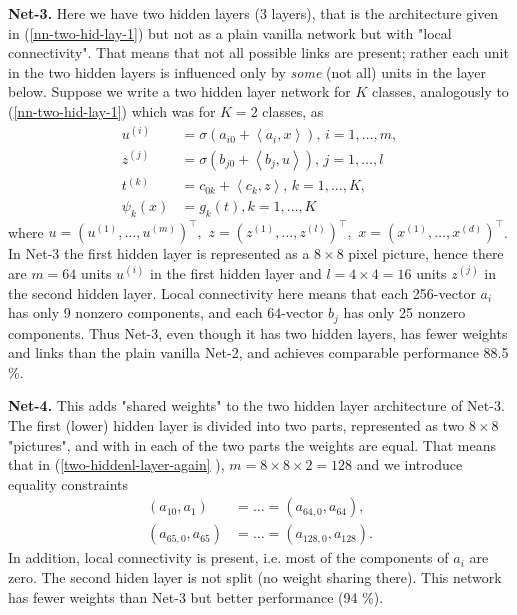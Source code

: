 \documentclass[11pt,twoside]{article}%
\theoremstyle{change}
\begin{document}
\bigskip

\textbf{Net-3.} Here we have two hidden layers (3 layers), that is the
architecture given in (\ref{nn-two-hid-lay-1}) but not as a plain vanilla
network but with "local connectivity". That means that not all possible links
are present; rather each unit in the two hidden layers is influenced only by
\textit{some} (not all) units in the layer below. Suppose we write a two
hidden layer network for $K$ classes, analogously to (\ref{nn-two-hid-lay-1})
which was for $K=2$ classes, as
\begin{align}
u^{(i)} &  =\sigma\left(  a_{i0}+\left\langle a_{i},x\right\rangle \right)
\text{, }i=1,\ldots,m,\label{two-hiddenl-layer-again}\\
z^{(j)} &  =\sigma\left(  b_{j0}+\left\langle b_{j},u\right\rangle \right)
\text{, }j=1,\ldots,l\\
t^{(k)} &  =c_{0k}+\left\langle c_{k},z\right\rangle \text{, }k=1,\ldots
,K,\nonumber\\
\psi_{k}(x) &  =g_{k}(t),k=1,\ldots,K\nonumber
\end{align}
where $u=(u^{(1)},\ldots,u^{(m)})^{\top},$ $z=(z^{(1)},\ldots,z^{(l)})^{\top
},$ $x=(x^{(1)},\ldots,x^{(d)})^{\top}$. In Net-3 the first hidden layer is
represented as a $8\times8$ pixel picture, hence there are $m=64$ units
$u^{(i)}$ in the first hidden layer and $l=4\times4=16$ units $z^{(j)}$ in the
second hidden layer. Local connectivity here means that each 256-vector
$a_{i}$ has only 9 nonzero components, and each $64$-vector $b_{j}$ has only
25 nonzero components. Thus Net-3, even though it has two hidden layers, has
fewer weights and links than the plain vanilla Net-2, and achieves comparable
performance 88.5 \%.

\bigskip

\textbf{Net-4. }This adds "shared weights" to the two hidden layer
architecture of Net-3. The first (lower) hidden layer is divided into two
parts, represented as two $8\times8$ "pictures", and with in each of the two
parts the weights are equal. That means that in (\ref{two-hiddenl-layer-again}%
), $m=8\times8\times2=128$ and we introduce equality constraints%
\begin{align*}
(a_{10},a_{1})  & =\ldots=(a_{64,0},a_{64})\text{, }\\
(a_{65,0},a_{65})  & =\ldots=(a_{128,0},a_{128}).
\end{align*}
In addition, local connectivity is present, i.e. most of the components of
$a_{i}$ are zero. The second hiden layer is not split (no weight sharing
there). This network has fewer weights than Net-3 but better performance (94 \%).
\end{document}
